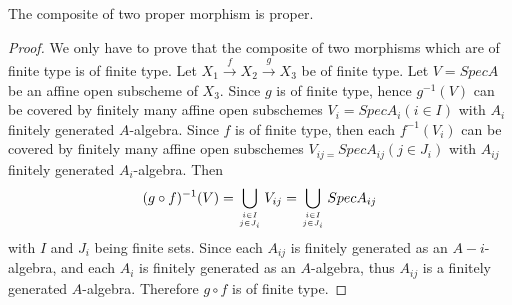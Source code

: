 \begin{prop}
The composite of two proper morphism is proper.
\end{prop}
\begin{proof}
We only have to prove that the composite of two morphisms which are
of finite type is of finite type. Let
$X_1\stackrel{f}{\rightarrow}X_2\stackrel{g}{\rightarrow}X_3$ be of
finite type. Let $V=SpecA$ be an affine open subscheme of $X_3.$
Since $g$ is of finite type, hence $g^{-1}(V)$ can be covered by
finitely many affine open subschemes $V_i=SpecA_i(i\in I)$ with
$A_i$ finitely generated $A$-algebra. Since $f$ is of finite type,
then each $f^{-1}(V_i)$ can be covered by finitely many affine open
subschemes $V_{ij=}SpecA_{ij}(j\in J_i)$ with $A_{ij}$ finitely
generated $A_i$-algebra. Then $$(g\circ
f)^{-1}(V)=\bigcup\limits_{i\in I \atop j\in
J_i}V_{ij}=\bigcup\limits_{i\in I \atop j\in J_i}SpecA_{ij}$$ with
$I$ and $J_i$ being finite sets. Since each $A_{ij}$ is finitely
generated as an $A-i$-algebra, and each $A_i$ is finitely generated
as an $A$-algebra, thus $A_{ij}$ is a finitely generated
$A$-algebra. Therefore $g\circ f$ is of finite type.
\end{proof}
